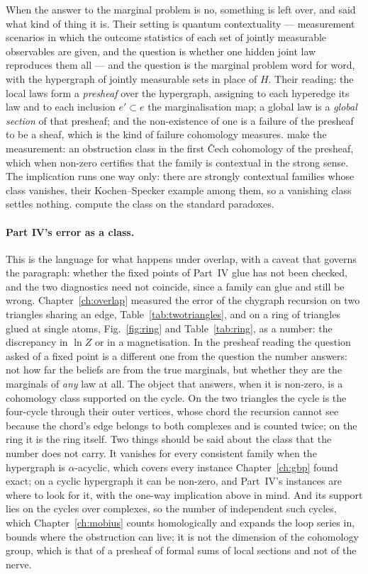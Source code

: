 When the answer to the marginal problem is no, something is left over, and
\citet{abramsky2011} said what kind of thing it is. Their setting is
quantum contextuality --- measurement scenarios in which the outcome
statistics of each set of jointly measurable observables are given, and the
question is whether one hidden joint law reproduces them all --- and the
question is the marginal problem word for word, with the hypergraph of
jointly measurable sets in place of $H$. Their reading: the local laws form
a \emph{presheaf} over the hypergraph, assigning to each hyperedge its law
and to each inclusion $e'\subset e$ the marginalisation map; a global law is
a \emph{global section} of that presheaf; and the non-existence of one is a
failure of the presheaf to be a sheaf, which is the kind of failure
cohomology measures. \citet{abramsky2012} make the measurement: an
obstruction class in the first \v{C}ech cohomology of the presheaf, which
when non-zero certifies that the family is contextual in the strong sense.
The implication runs one way only: there are strongly contextual families
whose class vanishes, their Kochen--Specker example among them, so a
vanishing class settles nothing. \citet{abramsky2015} compute the class on
the standard paradoxes.

\paragraph{Part IV's error as a class.} This is the language for what
happens under overlap, with a caveat that governs the paragraph: whether
the fixed points of Part~IV glue has not been checked, and the two
diagnostics need not coincide, since a family can glue and still be wrong.
Chapter~\ref{ch:overlap} measured the error of the chygraph recursion on
two triangles sharing an edge, Table~\ref{tab:twotriangles}, and on a ring
of triangles glued at single atoms, Fig.~\ref{fig:ring} and
Table~\ref{tab:ring}, as a number: the discrepancy in $\ln Z$ or in a
magnetisation. In the presheaf reading the question asked of a fixed point
is a different one from the question the number answers: not how far the
beliefs are from the true marginals, but whether they are the marginals of
\emph{any} law at all. The object that answers, when it is non-zero, is a
cohomology class supported on the cycle. On the two triangles the cycle is
the four-cycle through their outer vertices, whose chord the recursion
cannot see because the chord's edge belongs to both complexes and is
counted twice; on the ring it is the ring itself. Two things should be
said about the class that the number does not carry. It vanishes for every
consistent family when the hypergraph is $\alpha$-acyclic, which covers
every instance Chapter~\ref{ch:gbp} found exact; on a cyclic hypergraph it
can be non-zero, and Part~IV's instances are where to look for it, with the
one-way implication above in mind. And its support lies on the cycles over
complexes, so the number of independent such cycles, which
Chapter~\ref{ch:mobius} counts homologically and expands the loop series
in, bounds where the obstruction can live; it is not the dimension of the
cohomology group, which is that of a presheaf of formal sums of local
sections and not of the nerve.


